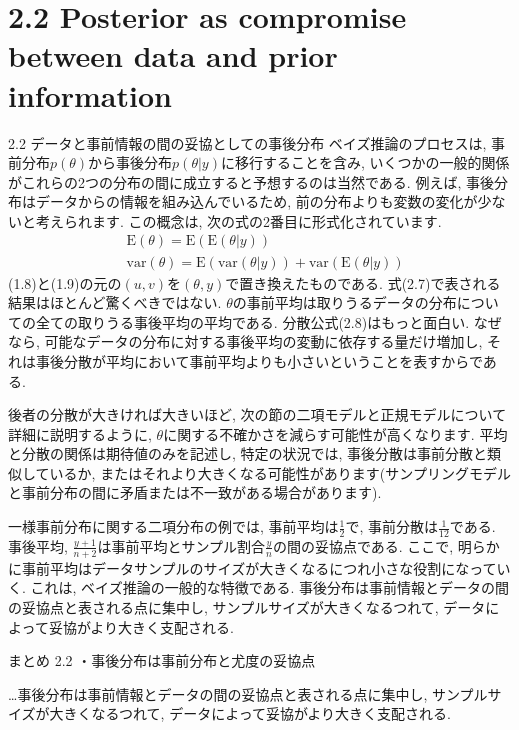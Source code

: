 \documentclass[10pt,dvipdfmx,a4]{beamer}
\newcommand{\eq}[1]{\begin{align}#1\end{align}}
\begin{document}
\section{2.2 Posterior as compromise between data and prior information}
\begin{frame}{2.2 データと事前情報の間の妥協としての事後分布}
ベイズ推論のプロセスは, 事前分布$p(\theta)$から事後分布$p(\theta|y)$に移行することを含み, いくつかの一般的関係がこれらの2つの分布の間に成立すると予想するのは当然である.
例えば, 事後分布はデータからの情報を組み込んでいるため, 前の分布よりも変数の変化が少ないと考えられます.
この概念は, 次の式の2番目に形式化されています.
\eq{&\text{E}(\theta)=\text{E}(\text{E}(\theta|y))\\
&\text{var}(\theta)=\text{E}(\text{var}(\theta|y))+\text{var}(\text{E}(\theta|y))}
(1.8)と(1.9)の元の$(u, v)$を$(\theta, y)$で置き換えたものである.
式(2.7)で表される結果はほとんど驚くべきではない.
$\theta$の事前平均は取りうるデータの分布についての全ての取りうる事後平均の平均である.
分散公式(2.8)はもっと面白い.
なぜなら, 可能なデータの分布に対する事後平均の変動に依存する量だけ増加し, それは事後分散が平均において事前平均よりも小さいということを表すからである.
\end{frame}


\begin{frame}
後者の分散が大きければ大きいほど, 次の節の二項モデルと正規モデルについて詳細に説明するように, $\theta$に関する不確かさを減らす可能性が高くなります.
平均と分散の関係は期待値のみを記述し, 特定の状況では, 事後分散は事前分散と類似しているか, またはそれより大きくなる可能性があります(サンプリングモデルと事前分布の間に矛盾または不一致がある場合があります).

一様事前分布に関する二項分布の例では, 事前平均は$\tfrac{1}{2}$で, 事前分散は$\tfrac{1}{12}$である.
事後平均, $\tfrac{y+1}{n+2}$は事前平均とサンプル割合$\tfrac{y}{n}$の間の妥協点である.
ここで, 明らかに事前平均はデータサンプルのサイズが大きくなるにつれ小さな役割になっていく.
これは, ベイズ推論の一般的な特徴である.
事後分布は事前情報とデータの間の妥協点と表される点に集中し, サンプルサイズが大きくなるつれて, データによって妥協がより大きく支配される.
\end{frame}


\begin{frame}{まとめ 2.2}
・事後分布は事前分布と尤度の妥協点

…事後分布は事前情報とデータの間の妥協点と表される点に集中し, サンプルサイズが大きくなるつれて, データによって妥協がより大きく支配される.

\end{frame}
\end{document}

